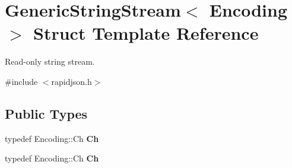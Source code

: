\hypertarget{structGenericStringStream}{}\section{Generic\+String\+Stream$<$ Encoding $>$ Struct Template Reference}
\label{structGenericStringStream}


Read-\/only string stream.  




{\ttfamily \#include $<$rapidjson.\+h$>$}

\subsection*{Public Types}
\begin{DoxyCompactItemize}
\item 
\mbox{\label{structGenericStringStream_a4289aca895330084ff3168e37e4f08bd}} 
typedef Encoding\+::\+Ch {\bfseries Ch}
\item 
\mbox{\label{structGenericStringStream_a4289aca895330084ff3168e37e4f08bd}} 
typedef Encoding\+::\+Ch {\bfseries Ch}
\end{DoxyCompactItemize}
